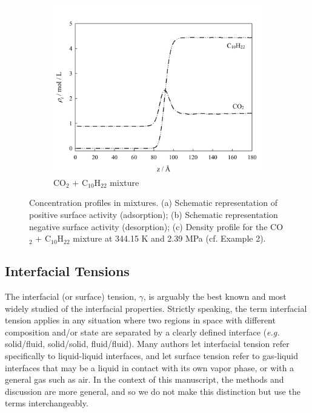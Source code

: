 \documentclass[9pt,tutorial]{livecoms}
\begin{document}
\begin{figure}
\begin{subfigure}{0.4\textwidth}
    \includegraphics[width=1\textwidth]{gfx/image4.png}
		\caption{CO$_{2}$ + C$_{10}$H$_{22}$ mixture} %
	\end{subfigure}
  \caption{Concentration profiles in mixtures. (a) Schematic representation of positive surface activity (adsorption); (b) Schematic representation negative surface activity (desorption); (c) Density profile for the CO$_{2}$ + C$_{10}$H$_{22}$ mixture at 344.15 K and 2.39 MPa (cf. Example 2).} %
  \label{fig:2}
\end{figure}

\subsection{Interfacial Tensions}
The interfacial (or surface) tension, $\gamma$, is arguably the best known and
most widely studied of the interfacial properties. Strictly speaking, the term
interfacial tension applies in any situation where two regions in space with
different composition and/or state are separated by a clearly defined interface
(\textit{e.g.} solid/fluid, solid/solid, fluid/fluid). Many authors let
interfacial tension refer specifically to liquid-liquid
interfaces, and let surface tension refer to gas-liquid interfaces that may be 
a liquid in contact with its own vapor phase, or with a general gas such as air.
In the context of this manuscript, the methods and discussion are more general,
and so we do not make this distinction but use the terms interchangeably.
\end{document}
